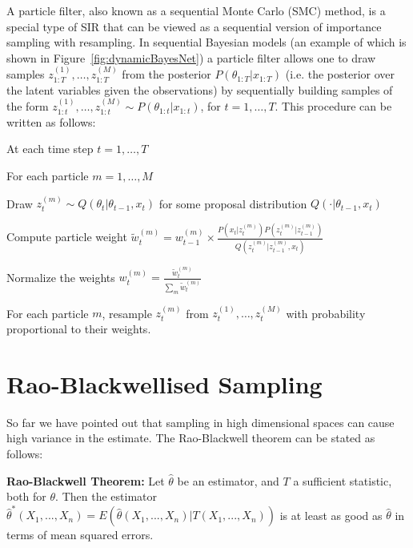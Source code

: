 \documentclass[twoside]{article}
\begin{document}
A particle filter, also known as a sequential Monte Carlo (SMC) method, is a special type of SIR that can be viewed as a sequential version of importance sampling with resampling. In sequential Bayesian models (an example of which is shown in Figure~\ref{fig:dynamicBayesNet}) a particle filter allows one to draw samples $z_{1:T}^{(1)},\ldots,z_{1:T}^{(M)}$ from the posterior $P(\theta_{1:T} | x_{1:T})$ (i.e. the posterior over the latent variables given the observations) by sequentially building samples of the form $z_{1:t}^{(1)},\ldots,z_{1:t}^{(M)} \sim P(\theta_{1:t} | x_{1:t})$, for $t=1,\ldots,T$. This procedure can be written as follows: 
\begin{enumerate*}
    \item At each time step $t=1,\ldots,T$
    \begin{enumerate*}
        \item For each particle $m = 1,\ldots,M$
        \begin{enumerate*}
            \item Draw $z_t^{(m)} \sim Q(\theta_t | \theta_{t-1}, x_t)$ for some proposal distribution $Q(\cdot|\theta_{t-1},x_t)$
            \item Compute particle weight $\tilde{w}_t^{(m)} = w_{t-1}^{(m)} \times \frac{P(x_t | z_t^{(m)}) P(z_t^{(m)}|z_{t-1}^{(m)})}{Q(z_t^{(m)} | z_{t-1}^{(m)}, x_t)}$
        \end{enumerate*}
        \item Normalize the weights $w_t^{(m)} = \frac{\tilde{w}_t^{(m)}}{\sum_m \tilde{w}_t^{(m)}}$
        \item For each particle $m$, resample $z_t^{(m)}$ from $z_t^{(1)},\ldots,z_t^{(M)}$ with probability proportional to their weights.
    \end{enumerate*}
\end{enumerate*}

\section{Rao-Blackwellised Sampling}
So far we have pointed out that sampling in high dimensional spaces can cause high variance in the estimate. The Rao-Blackwell theorem can be stated as follows:

\textbf{Rao-Blackwell Theorem:} Let $\hat{\theta}$ be an estimator, and $T$ a sufficient statistic, both for $\theta$. Then the estimator $\hat{\theta}^*(X_1,...,X_n)=E(\hat{\theta}(X_1,...,X_n)|T(X_1,...,X_n))$ is at least as good as $\hat{\theta}$ in terms of mean squared errors.
\end{document}
